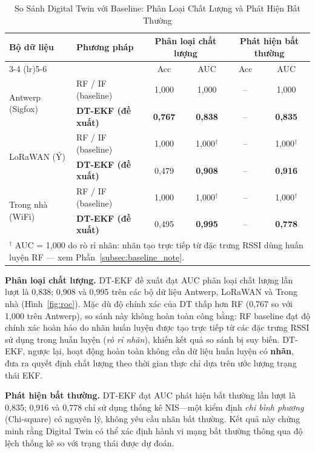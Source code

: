 \documentclass[conference]{IEEEtran}
\begin{document}
\begin{table}[t]
\centering
\small
\caption{So Sánh Digital Twin với Baseline: Phân Loại Chất Lượng và Phát Hiện Bất Thường}
\label{tab:dt_results}
\begin{tabular}{llcccc}
\toprule
\multirow{2}{*}{\textbf{Bộ dữ liệu}} &
\multirow{2}{*}{\textbf{Phương pháp}} &
\multicolumn{2}{c}{\textbf{Phân loại chất lượng}} &
\multicolumn{2}{c}{\textbf{Phát hiện bất thường}} \\
\cmidrule(lr){3-4} \cmidrule(lr){5-6}
& & Acc & AUC & Acc & AUC \\
\midrule
\multirow{2}{*}{Antwerp (Sigfox)}
  & RF / IF (baseline)          & 1,000 & 1,000           & --   & 1,000 \\
  & \textbf{DT-EKF (đề xuất)}   & \textbf{0,767} & \textbf{0,838} & --   & \textbf{0,835} \\
\midrule
\multirow{2}{*}{LoRaWAN (Ý)}
  & RF / IF (baseline)          & 1,000 & 1,000$^\dagger$ & --   & 1,000$^\dagger$ \\
  & \textbf{DT-EKF (đề xuất)}   & 0,479 & \textbf{0,908} & --   & \textbf{0,916} \\
\midrule
\multirow{2}{*}{Trong nhà (WiFi)}
  & RF / IF (baseline)          & 1,000 & 1,000$^\dagger$ & --   & 1,000$^\dagger$ \\
  & \textbf{DT-EKF (đề xuất)}   & 0,495 & \textbf{0,995} & --   & \textbf{0,778} \\
\midrule
\multicolumn{6}{l}{$^\dagger$ AUC = 1,000 do rò rỉ nhãn: nhãn tạo trực tiếp từ đặc trưng RSSI dùng huấn luyện RF --- xem Phần~\ref{subsec:baseline_note}.}\\
\bottomrule
\end{tabular}
\end{table}

\textbf{Phân loại chất lượng.} DT-EKF đề xuất đạt AUC phân loại
chất lượng lần lượt là 0,838; 0,908 và 0,995 trên các bộ dữ liệu
Antwerp, LoRaWAN và Trong nhà (Hình~\ref{fig:roc}). Mặc dù độ
chính xác của DT thấp hơn RF (0,767 so với 1,000 trên Antwerp),
so sánh này không hoàn toàn công bằng: RF baseline đạt độ chính
xác hoàn hảo do nhãn huấn luyện được tạo trực tiếp từ các đặc
trưng RSSI sử dụng trong huấn luyện (\textit{rò rỉ nhãn}), khiến
kết quả so sánh bị suy biến. DT-EKF, ngược lại, hoạt động hoàn
toàn không cần dữ liệu huấn luyện có \textbf{nhãn}, đưa ra quyết định
chất lượng theo thời gian thực chỉ dựa trên ước lượng trạng thái EKF.

\textbf{Phát hiện bất thường.} DT-EKF đạt AUC phát hiện bất thường
lần lượt là 0,835; 0,916 và 0,778 chỉ sử dụng thống kê NIS—một
kiểm định \textit{chi bình phương} (Chi-square) có nguyên lý, không yêu cầu nhãn bất
thường. Kết quả này chứng minh rằng Digital Twin có thể xác định
hành vi mạng bất thường thông qua độ lệch thống kê so với trạng
thái được dự đoán.
\end{document}
